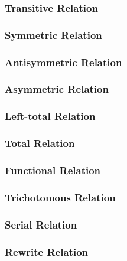 \subsubsection{Transitive Relation}\label{sec:transitive_relation}

\subsubsection{Symmetric Relation}\label{sec:symmetric_relation}

\subsubsection{Antisymmetric Relation}\label{sec:antisymmetric_relation}

\subsubsection{Asymmetric Relation}\label{sec:asymmetric_relation}

\subsubsection{Left-total Relation}\label{sec:lefttotal_relation}

\subsubsection{Total Relation}\label{sec:total_relation}

\subsubsection{Functional Relation}\label{sec:functional_relation}

\subsubsection{Trichotomous Relation}\label{sec:trichotomous_relation}

\subsubsection{Serial Relation}\label{sec:serial_relation}

\subsubsection{Rewrite Relation}\label{sec:rewrite_relation}

